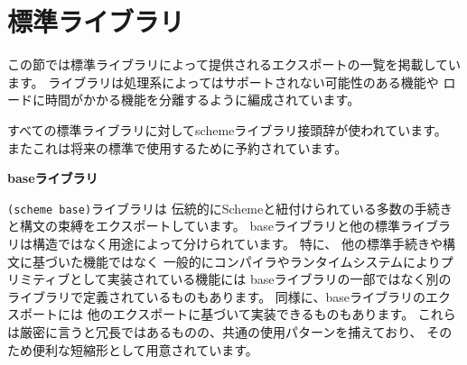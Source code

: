 \chapter{標準ライブラリ}
\label{stdlibraries}


この節では標準ライブラリによって提供されるエクスポートの一覧を掲載しています。
ライブラリは処理系によってはサポートされない可能性のある機能や
ロードに時間がかかる機能を分離するように編成されています。

すべての標準ライブラリに対して{\cf scheme}ライブラリ接頭辞が使われています。
またこれは将来の標準で使用するために予約されています。

\textbf{baseライブラリ}

\texttt{(scheme base)}ライブラリは
伝統的にSchemeと紐付けられている多数の手続きと構文の束縛をエクスポートしています。
baseライブラリと他の標準ライブラリは構造ではなく用途によって分けられています。
特に、
他の標準手続きや構文に基づいた機能ではなく
一般的にコンパイラやランタイムシステムによりプリミティブとして実装されている機能には
baseライブラリの一部ではなく別のライブラリで定義されているものもあります。
同様に、baseライブラリのエクスポートには
他のエクスポートに基づいて実装できるものもあります。
これらは厳密に言うと冗長ではあるものの、共通の使用パターンを捕えており、
そのため便利な短縮形として用意されています。

